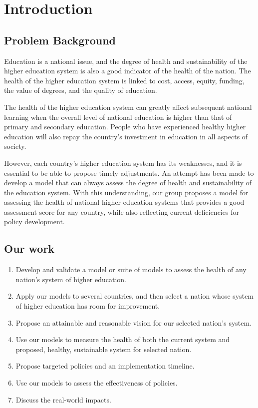 \documentclass[12pt]{article}  %
\begin{document}
\maketitle  %

\tableofcontents  %


\section{Introduction}
\subsection{Problem Background}
Education is a national issue, and the degree of health and sustainability of the higher education system is also a good indicator of the health of the nation. The health of the higher education system is linked to cost, access, equity, funding, the value of degrees, and the quality of education. 

The health of the higher education system can greatly affect subsequent national learning when the overall level of national education is higher than that of primary and secondary education. People who have experienced healthy higher education will also repay the country's investment in education in all aspects of society. 

However, each country's higher education system has its weaknesses, and it is essential to be able to propose timely adjustments. An attempt has been made to develop a model that can always assess the degree of health and sustainability of the education system. With this understanding, our group proposes a model for assessing the health of national higher education systems that provides a good assessment score for any country, while also reflecting current deficiencies for policy development.
\subsection{Our work}

\begin{enumerate}[\bfseries 1.]
    \item Develop and validate a model or suite of models to assess the health of any nation’s system of higher education. 
    \item Apply our models to several countries, and then select a nation whose system of higher education has room for improvement.
    \item Propose an attainable and reasonable vision for our selected nation’s system.
    \item Use our models to measure the health of both the current system and proposed, healthy, sustainable system for selected nation.
    \item Propose targeted policies and an implementation timeline.
    \item Use our models to assess the effectiveness of policies.
    \item Discuss the real-world impacts.
\end{enumerate}
\end{document}
